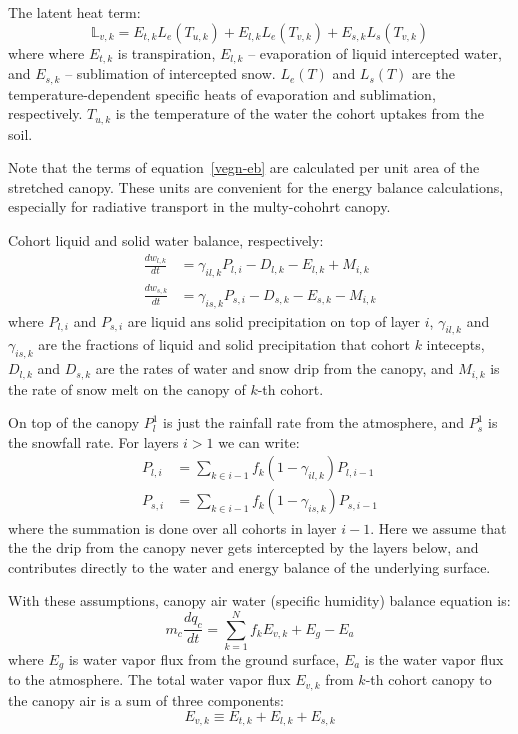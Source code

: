 \documentclass{article}
\newcommand{\wlk}{w_{l,k}}
\newcommand{\wsk}{w_{s,k}}
\newcommand{\fderiv}[2]{\frac{d #1}{d #2}} %
\newcommand{\csum}{\sum_{k=1}^N} %
\newcommand{\layerfrac}{f}       %
\newcommand{\intercept}{\gamma}  %
\begin{document}
The latent heat term:
\begin{equation}
   \mathbb{L}_{v,k} =  E_{t,k} L_e(T_{u,k}) + E_{l,k} L_e(T_{v,k}) + E_{s,k} L_s(T_{v,k})
\end{equation}
%
where
where
$E_{t,k}$ is transpiration, 
$E_{l,k}$ -- evaporation of liquid intercepted water,
and
$E_{s,k}$ -- sublimation of intercepted snow.
$L_e(T)$ and $L_s(T)$ are the temperature-dependent specific heats of
evaporation and sublimation, respectively.
$T_{u,k}$ is the temperature of the water the cohort uptakes from the soil.

Note that the terms of equation~\eqref{vegn-eb} are calculated per unit area of
the stretched canopy. These units are convenient for the energy balance calculations,
especially for radiative transport in the multy-cohohrt canopy.

Cohort liquid and solid water balance, respectively:
%
\begin{align}
   \label{vegn-mb-l}
   \fderiv{\wlk}{t} & = \intercept_{il,k} P_{l,i} - D_{l,k} - E_{l,k} + M_{i,k} \\
   \label{vegn-mb-f}
   \fderiv{\wsk}{t} & = \intercept_{is,k} P_{s,i} - D_{s,k} - E_{s,k} - M_{i,k}
\end{align}
%
where $P_{l,i}$ and $P_{s,i}$ are liquid ans solid precipitation on top of layer $i$,
$\intercept_{il,k}$ and $\intercept_{is,k}$ are the fractions of liquid and solid
precipitation that cohort $k$ intecepts,
$D_{l,k}$ and $D_{s,k}$ are the rates of water and snow drip from the canopy,
and
$M_{i,k}$ is the rate of snow melt on the canopy of $k$-th cohort.

On top of the canopy $P_l^1$ is just the rainfall rate from the atmosphere, and
$P_s^1$ is the snowfall rate. 
For layers $i>1$ we can write: 
%
\begin{align}
   P_{l,i} & = \sum_{k \in i-1} \layerfrac_k (1-\intercept_{il,k})P_{l,i-1} \label{drip-l} \\
   P_{s,i} & = \sum_{k \in i-1} \layerfrac_k (1-\intercept_{is,k})P_{s,i-1} \label{drip-s} 
\end{align}
%
where the summation is done over all cohorts in layer $i-1$.
Here we assume that the the drip from the canopy never gets intercepted by the
layers below, and contributes directly to the water and energy balance of the underlying 
surface.

With these assumptions, canopy air water (specific humidity) balance equation is:
%
\begin{equation}\label{cana-mb}
   m_c\fderiv{q_c}{t} = \csum \layerfrac_k E_{v,k} + E_g - E_a
\end{equation}
%
where 
$E_g$ is water vapor flux from the ground surface,
$E_a$ is the water vapor flux to the atmosphere.
The total water vapor flux $E_{v,k}$ from $k$-th cohort canopy to the canopy 
air is a sum of three components:
\begin{equation}
   E_{v,k} \equiv E_{t,k} + E_{l,k} + E_{s,k} 
\end{equation}
\end{document}
